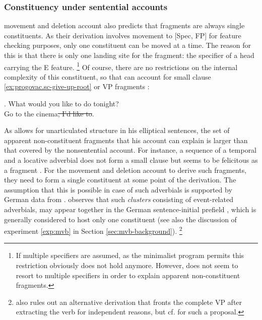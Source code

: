 \subsubsection{Constituency under sentential accounts}
 movement and deletion account also predicts that fragments are always single constituents. As their derivation involves movement to [Spec, FP] for feature checking purposes, only one constituent can be moved at a time. The reason for this is that there is only one landing site for the fragment: the specifier of a head carrying the E feature.%
%
\footnote{If multiple specifiers are assumed, as the minimalist program permits \citep[285]{chomsky1995} this restriction obviously does not hold anymore. However, \citet{merchant2004} does not seem to resort to multiple specifiers in order to explain apparent non-constituent fragments.}\afterfn
%
Of course, there are no restrictions on the internal complexity of this constituent, so that \citet{merchant2004} can account for small clause \ref{ex:progovac.sc-give-up-root} or VP fragments \Next:

\ex. What would you like to do tonight?\\ \label{ex:vp-fronting}
Go to the cinema\sout{, I'd like to}.

As \citet{merchant2004} allows for unarticulated structure in his elliptical sentences, the set of apparent non-constituent fragments that his account can explain is larger than that covered by the nonsentential account. For instance, a sequence of a temporal and a locative adverbial does not form a small clause but seems to be felicitous as a fragment \Next. For the movement and deletion account to derive such fragments, they need to form a single constituent at some point of the derivation. The assumption that this is possible in case of such adverbials is supported by German data from \citet{haider2000}. \citeauthor{haider2000} observes that such \textit{clusters} consisting of event-related adverbials, may appear together in the German sentence-initial prefield \NNext, which is generally considered to host only one constituent (see also the discussion of experiment \ref{exp:mvb} in Section \ref{sec:mvb-background}).%
% 
\footnote{\citet[104-105]{haider2000} also rules out an alternative derivation that fronts the complete VP after extracting the verb for independent reasons, but cf. \citet{muller2004} for such a proposal.}\afterfn%
%

